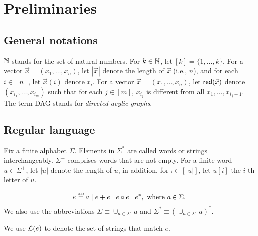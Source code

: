 
\section{Preliminaries}

\subsection*{General notations} 
$\mathbb{N}$ stands for the set of natural numbers. For $k \in \mathbb{N}$, let $[k] = \{1,\dots, k\}$. For a vector $\vec{x}=(x_1,\dots, x_n)$, let $|\vec{x}|$ denote the length of $\vec{x}$ (i.e., $n$), and for each $i \in [n]$, let $\vec{x}(i)$ denote $x_i$. For a vector $\vec{x} = (x_1, \dots, x_n)$, let $\mathsf{red}(\vec{x})$ denote $(x_{i_1},\dots, x_{i_m})$ such that for each $j \in [m]$, $x_{i_j}$ is different from all $x_1, \dots, x_{i_j-1}$.
The term DAG stands for \emph{directed acylic graphs}.

\subsection*{Regular language}
Fix a finite alphabet $\Sigma$. Elements in $\Sigma^*$ are called words or strings interchangeably. $\Sigma^+$ comprises words that are not empty. For a finite word $u \in \Sigma^+$, let $|u|$ denote the length of $u$, in addition, for $i \in [|u|]$, let $u[i]$ the $i$-th letter of $u$.

\begin{definition}
	\[e \eqdef a \mid e + e \mid e \concat e \mid e^\ast, \mbox{ where } a \in \Sigma. \]
	We also use the abbreviations $\Sigma \equiv \cup_{a \in \Sigma}\ a$ and $\Sigma^\ast \equiv (\cup_{a \in \Sigma}\ a)^\ast$.
\end{definition}

We use $\mathcal{L}(e)$ to denote the set of strings that match $e$.


